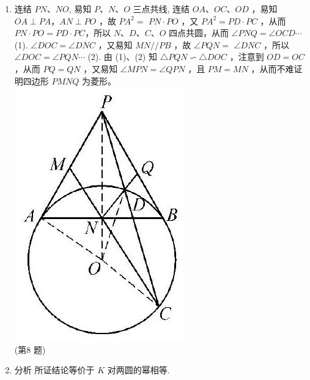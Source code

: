 \documentclass[10pt]{article}
\begin{document}
\begin{enumerate}
(第7题)
  \item 连结 $P N 、 N O$, 易知 $P 、 N 、 O$ 三点共线, 连结 $O A 、 O C 、 O D$ ，易知 $O A \perp P A ， A N \perp P O$ ，故 $P A^{2}=$ $P N \cdot P O$ ，又 $P A^{2}=P D \cdot P C$ ，从而 $P N \cdot P O=P D \cdot P C ，$所以 $N 、 D 、 C 、 O$ 四点共圆，从而 $\angle P N Q=\angle O C D \cdots$ (1). $\angle D O C=\angle D N C$ ，又易知 $M N / / P B$ ，故 $\angle P Q N=$ $\angle D N C$ ，所以 $\angle D O C=\angle P Q N \cdots$ (2). 由 (1)、(2) 知 $\triangle P Q N \backsim \triangle D O C$ ，注意到 $O D=O C$ ，从而 $P Q=Q N$ ，又易知 $\angle M P N=\angle Q P N$ ，且 $P M=M N$ ，从而不难证明四边形 $P M N Q$ 为菱形。\\
\includegraphics[max width=\textwidth, center]{2024_10_30_66b8e5e701da2093c133g-101}\\
(第8 题)
  \item 分析 所证结论等价于 $K$ 对两圆的幂相等.
\end{enumerate}
\end{document}
